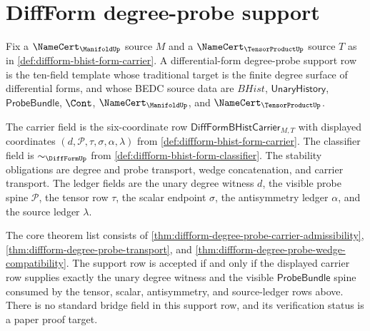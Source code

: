 \section{DiffForm degree-probe support}
\label{sec:diffform-degree-probe-support}

\begin{definition}
\label{def:diffform-degree-probe-support-row}
Fix a $\NameCert_{\ManifoldUp}$ source $M$ and a
$\NameCert_{\TensorProductUp}$ source $T$ as in
\autoref{def:diffform-bhist-form-carrier}. A differential-form degree-probe
support row is the ten-field template whose traditional target is the finite
degree surface of differential forms, and whose BEDC source data are
$BHist$, $\mathsf{UnaryHistory}$, $\mathsf{ProbeBundle}$, $\Cont$,
$\NameCert_{\ManifoldUp}$, and $\NameCert_{\TensorProductUp}$.

The carrier field is the six-coordinate row
$\mathsf{DiffFormBHistCarrier}_{M,T}$ with displayed coordinates
$(d,\mathcal{P},\tau,\sigma,\alpha,\lambda)$ from
\autoref{def:diffform-bhist-form-carrier}. The classifier field is
$\sim_{\DiffFormUp}$ from \autoref{def:diffform-bhist-form-classifier}. The
stability obligations are degree and probe transport, wedge concatenation,
and carrier transport. The ledger fields are the unary degree witness $d$,
the visible probe spine $\mathcal{P}$, the tensor row $\tau$, the scalar
endpoint $\sigma$, the antisymmetry ledger $\alpha$, and the source ledger
$\lambda$.

The core theorem list consists of
\autoref{thm:diffform-degree-probe-carrier-admissibility},
\autoref{thm:diffform-degree-probe-transport}, and
\autoref{thm:diffform-degree-probe-wedge-compatibility}. The support row is
accepted if and only if the displayed carrier row supplies exactly the unary
degree witness and the visible $\mathsf{ProbeBundle}$ spine consumed by the
tensor, scalar, antisymmetry, and source-ledger rows above. There is no
standard bridge field in this support row, and its verification status is a
paper proof target.
\end{definition}

